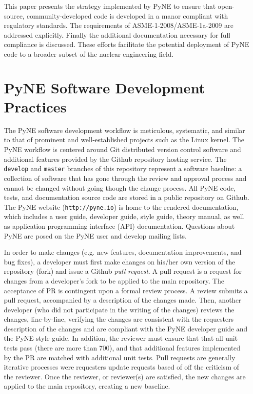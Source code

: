 \documentclass{anstrans}
\begin{document}
This paper presents the strategy implemented by PyNE to ensure that
open-source, community-developed code is developed in a manor compliant with
regulatory standards. The requirements of ASME-1-2008/ASME-1a-2009 are
addressed explicitly. Finally the additional documentation necessary for full
compliance is discussed. These efforts facilitate the potential deployment of
PyNE code to a broader subset of the nuclear engineering field.


\section{PyNE Software Development Practices}

The PyNE software development workflow is meticulous, systematic, and similar
to that of prominent and well-established projects such as the Linux kernel.
The PyNE workflow is centered around Git distributed version control software
and additional features provided by the Github repository hosting service.  The
\texttt{develop} and \texttt{master} branches of this repository represent a
software baseline: a collection of software that has gone through the review
and approval process and cannot be changed without going though the change
process.  All PyNE code, tests, and documentation source code are stored in a
public repository on Github. The PyNE website (\texttt{http://pyne.io}) is home
to the rendered documentation, which includes a user guide, developer guide,
style guide, theory manual, as well as application programming interface (API)
documentation.  Questions about PyNE are posed on the PyNE user and develop
mailing lists.

In order to make changes (e.g. new features, documentation improvements, and
bug fixes), a developer must first make changes on his/her own version of the
repository (fork) and issue a Github \emph{pull request}. A pull request is a
request for changes from a developer's fork to be applied to the main
repository. The acceptance of PR is contingent upon a formal review process. A
review submits a pull request, accompanied by a description of the changes
made.  Then, another developer (who did not participate in the writing of the
changes) reviews the changes, line-by-line, verifying the changes are
consistent with the requesters description of the changes and are compliant
with the PyNE developer guide and the PyNE style guide. In addition, the
reviewer must ensure that that all unit tests pass (there are more than 700),
and that additional features implemented by the PR are matched with additional
unit tests. Pull requests are generally iterative processes were requesters
update requests based of off the criticism of the reviewer. Once the reviewer,
or reviewer(s) are satisfied, the new changes are applied to the main
repository, creating a new baseline.
\end{document}
